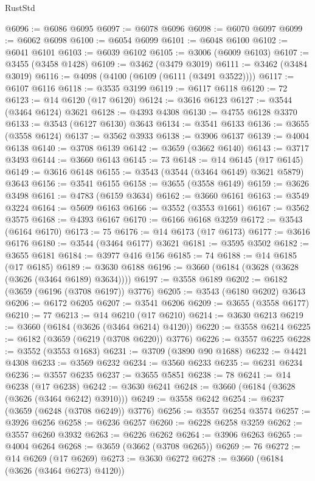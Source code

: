 \begin{lexlean}{RustStd}
\begin{coremodule}
@6096 := @6086 @6095
@6097 := @6078 @6096
@6098 := @6070 @6097
@6099 := @6062 @6098
@6100 := @6054 @6099
@6101 := @6048 @6100
@6102 := @6041 @6101
@6103 := @6039 @6102
@6105 := @3006 (@6009 @6103)
@6107 := @3455 (@3458 @1428)
@6109 := @3462 (@3479 @3019)
@6111 := @3462 (@3484 @3019)
@6116 := @4098 (@4100 (@6109 (@6111 (@3491 @3522))))
@6117 := @6107 @6116
@6118 := @3535 @3199
@6119 := @6117 @6118
@6120 := 72
@6123 := @14 @6120 (@17 @6120)
@6124 := @3616 @6123
@6127 := @3544 (@3464 @6124) @3621
@6128 := @4393 @4308
@6130 := @4755 @6128 @3370
@6133 := @3543 (@6127 @6130) @3643
@6134 := @3541 @6133
@6136 := @3655 (@3558 @6124)
@6137 := @3562 @3933
@6138 := @3906 @6137
@6139 := @4004 @6138
@6140 := @3708 @6139
@6142 := @3659 (@3662 @6140)
@6143 := @3717 @3493
@6144 := @3660 @6143
@6145 := 73
@6148 := @14 @6145 (@17 @6145)
@6149 := @3616 @6148
@6155 := @3543 (@3544 (@3464 @6149) @3621 @5879) @3643
@6156 := @3541 @6155
@6158 := @3655 (@3558 @6149)
@6159 := @3626 @3498
@6161 := @4783 (@6159 @3634)
@6162 := @3660 @6161
@6163 := @3549 @3224
@6164 := @5609 @6163
@6166 := @3552 (@3553 @1661)
@6167 := @3562 @3575
@6168 := @4393 @6167
@6170 := @6166 @6168 @3259
@6172 := @3543 (@6164 @6170)
@6173 := 75
@6176 := @14 @6173 (@17 @6173)
@6177 := @3616 @6176
@6180 := @3544 (@3464 @6177) @3621
@6181 := @3595 @3502
@6182 := @3655 @6181
@6184 := @3977 @416 @156
@6185 := 74
@6188 := @14 @6185 (@17 @6185)
@6189 := @3630 @6188
@6196 := @3660 (@6184 (@3628 (@3628 (@3626 (@3464 @6189) @3634))))
@6197 := @3558 @6189
@6202 := @6182 (@3659 (@6196 (@3708 @6197)) @3776)
@6205 := @3543 (@6180 @6202) @3643
@6206 := @6172 @6205
@6207 := @3541 @6206
@6209 := @3655 (@3558 @6177)
@6210 := 77
@6213 := @14 @6210 (@17 @6210)
@6214 := @3630 @6213
@6219 := @3660 (@6184 (@3626 (@3464 @6214) @4120))
@6220 := @3558 @6214
@6225 := @6182 (@3659 (@6219 (@3708 @6220)) @3776)
@6226 := @3557 @6225
@6228 := @3552 (@3553 @1683)
@6231 := @3709 (@3890 @90 @1688)
@6232 := @4421 @4308
@6233 := @3569 @6232
@6234 := @3560 @6233
@6235 := @6231 @6234
@6236 := @3557 @6235
@6237 := @3655 @5851
@6238 := 78
@6241 := @14 @6238 (@17 @6238)
@6242 := @3630 @6241
@6248 := @3660 (@6184 (@3628 (@3626 (@3464 @6242) @3910)))
@6249 := @3558 @6242
@6254 := @6237 (@3659 (@6248 (@3708 @6249)) @3776)
@6256 := @3557 @6254 @3574
@6257 := @3926 @6256
@6258 := @6236 @6257
@6260 := @6228 @6258 @3259
@6262 := @3557 @6260 @3932
@6263 := @6226 @6262
@6264 := @3906 @6263
@6265 := @4004 @6264
@6268 := @3659 (@3662 (@3708 @6265))
@6269 := 76
@6272 := @14 @6269 (@17 @6269)
@6273 := @3630 @6272
@6278 := @3660 (@6184 (@3626 (@3464 @6273) @4120))

\end{coremodule}
\end{lexlean}
